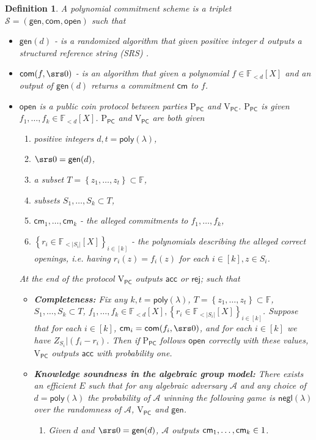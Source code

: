 \documentclass[11pt]{article} %
\newcommand{\F}{\ensuremath{\mathbb F}\xspace}
\newcommand{\adv}{\ensuremath{\mathcal A}\xspace}
\newcommand{\com}{\ensuremath{\mathsf{com}}\xspace}
\newcommand{\cm}{\ensuremath{\mathsf{cm}}\xspace}
\newcommand{\open}{\ensuremath{\mathsf{open}}\xspace}
\newcommand{\negl}{\ensuremath{\mathsf{negl}(\lambda)}\xspace}
\newcommand{\rej}{\ensuremath{\mathsf{rej}}\xspace}
\newcommand{\acc}{\ensuremath{\mathsf{acc}}\xspace}
\newcommand{\sett}[2]{\ensuremath{\set{#1}_{#2}}\xspace}
\newcommand{\gen}{\ensuremath{\mathsf{gen}}\xspace}
\newcommand{\prvpc}{\ensuremath{\mathrm{P_{\mathsf{PC}}}}\xspace}
\newcommand{\verpc}{\ensuremath{\mathrm{V_{\mathsf{PC}}}}\xspace}
\newcommand{\ext}{\ensuremath{E}\xspace}
\newcommand{\set}[1]{\ensuremath{\left\{#1\right\}}\xspace}
\newcommand{\polysofdeg}[1]{\ensuremath{\F_{< #1}[X]}\xspace}
\newcommand{\PCscheme}{\ensuremath{\mathscr{S}}\xspace}
\newtheorem{dfn}[lemma]{Definition}
\newcommand{\poly}{\ensuremath{\mathsf{poly(\lambda)}}\xspace}
\begin{document}
\begin{dfn}\label{dfn:PCscheme}
A polynomial commitment scheme is a triplet $\PCscheme = (\gen,\com,\open)$ such that
\begin{itemize}
 \item $\gen(d)$ -  is a randomized algorithm that given positive integer $d$ outputs a structured reference string (SRS) .
 \item $\com(f,\srs0)$ - is an algorithm that given a polynomial $f\in \polysofdeg{d}$ and an output  of $\gen(d)$  returns a commitment \cm to $f$.
 \item \open is a public coin protocol between parties \prvpc and \verpc. \prvpc is given $ f_1,\ldots,f_k \in \polysofdeg{d}$. \prvpc and \verpc are both given

 \begin{enumerate}
  \item  positive integers $d,t=\poly$,
  \item  $\srs0=\gen(d)$,
  \item a subset $T=\set{z_1,\ldots,z_t}\subset \F$,
  \item subsets $S_1,\ldots,S_k \subset T$,
  \item $\cm_1,\ldots,\cm_k$ - the alleged commitments to $f_1,\ldots,f_k$,
  \item \sett{r_i\in \polysofdeg{|S_i|}}{i\in [k]} - the polynomials describing the alleged correct openings, i.e. having  $r_i(z)=f_i(z)$ for each $i\in [k], z\in S_i$.
 \end{enumerate}
 At the end of the protocol \verpc outputs \acc or \rej;
such that
\begin{itemize}
 \item \textbf{Completeness:} Fix any $k,t=\poly$, $T=\set{z_1,\ldots,z_t}\subset \F$, $S_1,\ldots,S_k \subset T$, $f_1,\ldots,f_k\in \polysofdeg{d},\sett{r_i\in \polysofdeg{|S_i|}}{i\in [k]}$. Suppose that for each $i\in [k]$, $\cm_i = \com(f_i,\srs0)$, and for each $i\in [k]$ we have  $Z_{S_i}|(f_i-r_i)$.  Then if \prvpc follows \open correctly with these values, \verpc outputs \acc with probability one.
 \item \textbf{Knowledge soundness in the algebraic group model:} There exists an efficient \ext such that for any algebraic adversary \adv and any choice of $d=\poly$ the probability of \adv winning the following game is \negl over the randomness of \adv, \verpc and \gen.
 \begin{enumerate}
  \item Given $d$ and $\srs0=\gen(d)$, \adv outputs $\cm_1,\ldots,\cm_k\in \G1$.

\end{enumerate}
\end{itemize}
\end{itemize}
\end{dfn}
\end{document}
